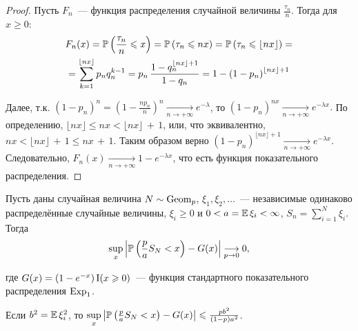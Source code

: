 \begin{proof}
    Пусть $F_n$~--- функция распределения случайной величины $\frac{\tau_n}{n}$.
    Тогда для $x \geqslant 0$:
    \begin{multline*}        
        F_{n}(x)=\operatorname{\mathbb{P}}\left(\frac{\tau_{n}}{n} \leqslant x\right)=
        \operatorname{\mathbb{P}}\left(\tau_{n} \leqslant n x\right) = 
        \operatorname{\mathbb{P}}\left(\tau_{n} \leqslant \lfloor n x\rfloor\right) = \\
        = \sum\limits_{k = 1}^{\lfloor nx \rfloor} p_n q_n^{k-1} = 
        p_n \, \frac{1 - q_n^{\lfloor nx \rfloor + 1}} {1-q_n} = 
        1-\left(1-p_{n}\right)^{\lfloor nx \rfloor + 1}
    \end{multline*}
    
    Далее, т.к. $\left(1-p_{n}\right)^{n}=\left(1-\frac{n p_{n}}{n}\right)^{n} \xrightarrow[n \to +\infty]{} e^{-\lambda}$, 
    то $(1 - p_n)^{nx} \xrightarrow[n \to +\infty]{} e^{-\lambda x}.$ 
    По определению, $\lfloor n x\rfloor \leqslant n x<\lfloor n x\rfloor\,+\,1$, 
    или, что эквивалентно, $nx < \lfloor nx \rfloor \,+\,1 \leqslant nx\,+\,1$. 
    Таким образом верно $(1 - p_n)^{\lfloor nx \rfloor + 1} \xrightarrow[n \to +\infty]{} e^{-\lambda x}$. 
    Следовательно, $F_n(x) \xrightarrow[n \to +\infty]{} 1 - e^{-\lambda x}$, что есть функция показательного распределения. 
\end{proof}



\begin{namedthm}
Пусть даны случайная величина $N \sim \operatorname{\mathrm{Geom}}_{p}$, $\xi_1, \xi_2, \ldots$~--- независимые одинаково распределённые случайные величины, 
$\xi_i \geqslant 0$ и $0 < a = \operatorname{\mathbb{E}} \xi_i < \infty$, $S_n = \sum\limits_{i=1}^N \xi_i$. Тогда
\begin{equation*}
    \sup\limits_{x}\left|\operatorname{\mathbb{P}}\left(\frac{p}{a} S_{N}<x\right)-G(x)\right| \underset{p \to 0}{\longrightarrow} 0,
\end{equation*}

где $G(x)=\left(1-e^{-x}\right) \operatorname{\mathrm{I}}(x \geqslant 0)$~--- функция стандартного показательного распределения $\operatorname{\mathrm{Exp}}_{1}$.

Если $b^2 = \operatorname{\mathbb{E}} \xi_i^2$, то $\sup\limits_{x}\left|\operatorname{\mathbb{P}}\left(\frac{p}{a} S_{N}<x\right)-G(x)\right| \leqslant \frac{p b^{2}}{(1-p) a^{2}}$.
\end{namedthm}
